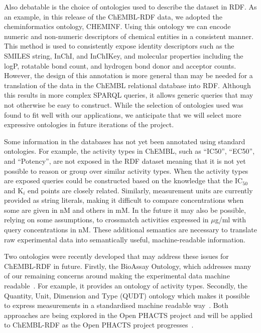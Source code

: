 \documentclass[10pt]{bmc_article}
\newenvironment{bmcformat}{\begin{raggedright}\baselineskip20pt\sloppy\setboolean{publ}{false}}{\end{raggedright}\baselineskip20pt\sloppy}
\begin{document}
\begin{bmcformat}
Also debatable is the choice of ontologies used to describe the dataset in RDF. As an example, in this release of the
ChEMBL-RDF data, we adopted the cheminformatics ontology, CHEMINF. Using this ontology
we can encode numeric and non-numeric descriptors of chemical entities in a consistent
manner. This method is used to consistently expose identity descriptors such
as the SMILES string, InChI, and InChIKey, and molecular properties including the
logP, rotatable bond count, and hydrogen bond donor and acceptor counts.
However, the design of this annotation is more general than may be needed for a translation
of the data in the ChEMBL relational database into RDF. Although this results in more 
complex SPARQL queries, it allows generic queries that may not otherwise be easy to construct.
While the selection of ontologies used was found to fit well with our applications,
we anticipate that we will select more expressive ontologies in future iterations of the project.

Some information in the databases has not yet been annotated using standard ontologies. 
For example, the activity types in ChEMBL, such as ``IC50'', ``EC50'', and ``Potency'', are not exposed in the RDF dataset
meaning that it is not yet possible to reason or group over similar activity types.
When the activity types are exposed queries could be constructed based on the knowledge 
that the IC$_{50}$ and K$_i$ end points are closely related. Similarly, measurement units are currently provided as
string literals, making it difficult to compare concentrations when some are given in nM and others in mM.
In the future it may also be possible, relying on some assumptions, to crossmatch activities
expressed in $\mu$g/ml with query concentrations in nM. These additional semantics are necessary 
to translate raw experimental data into semantically useful, machine-readable information.

Two ontologies were recently developed that may address these issues for ChEMBL-RDF in future.
Firstly, the BioAssay Ontology, which addresses many of our
remaining concerns around making the experimental data machine readable~\cite{Visser2011}. For example,
it provides an ontology of activity types. Secondly,
the Quantity, Unit, Dimension and Type (QUDT) ontology which makes it possible
to express measurements in a standardised machine readable way~\cite{QUDT}. Both approaches are 
being explored in the Open PHACTS project and will be applied to ChEMBL-RDF as the Open PHACTS project progresses~\cite{Williams2012}.


\end{bmcformat}
\end{document}
